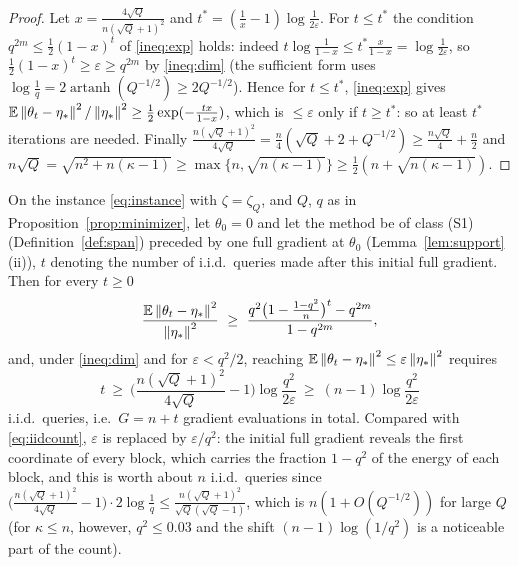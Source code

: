 \begin{proof}
Let $x=\frac{4\sqrt Q}{n(\sqrt Q+1)^2}$ and $t^\ast=(\frac1x-1)\log\frac1{2\varepsilon}$. For $t\le t^\ast$ the condition $q^{2m}\le\frac12(1-x)^t$ of \eqref{ineq:exp} holds: indeed $t\log\frac1{1-x}\le t^\ast\frac{x}{1-x}=\log\frac1{2\varepsilon}$, so $\frac12(1-x)^t\ge\varepsilon\ge q^{2m}$ by \eqref{ineq:dim} (the sufficient form uses $\log\frac1q=2\operatorname{artanh}(Q^{-1/2})\ge2Q^{-1/2}$). Hence for $t\le t^\ast$, \eqref{ineq:exp} gives $\mathbb{E}\left\|\theta_t-\eta_\ast\right\|^2/\left\|\eta_\ast\right\|^2\ge\frac12\exp(-\frac{tx}{1-x})$, which is $\le\varepsilon$ only if $t\ge t^\ast$: so at least $t^\ast$ iterations are needed. Finally $\frac{n(\sqrt Q+1)^2}{4\sqrt Q}=\frac n4(\sqrt Q+2+Q^{-1/2})\ge\frac{n\sqrt Q}4+\frac n2$ and $n\sqrt Q=\sqrt{n^2+n(\kappa-1)}\ge\max\{n,\sqrt{n(\kappa-1)}\}\ge\frac12(n+\sqrt{n(\kappa-1)})$.
\end{proof}

\begin{corollary}
\label{cor:sweep}
On the instance \eqref{eq:instance} with $\zeta=\zeta_Q$, and $Q$, $q$ as in Proposition~\ref{prop:minimizer}, let $\theta_0=0$ and let the method be of class (S1) (Definition~\ref{def:span}) preceded by one full gradient at $\theta_0$ (Lemma~\ref{lem:support}(ii)), $t$ denoting the number of i.i.d.\ queries made after this initial full gradient. Then for every $t\ge0$
\begin{equation}
\label{ineq:expected-sweep}
\frac{\E\norm{\theta_t-\etastar}^2}{\norm{\etastar}^2}\ \ge\ \frac{q^2\big(1-\frac{1-q^2}n\big)^t-q^{2m}}{1-q^{2m}},
\end{equation}
and, under \eqref{ineq:dim} and for $\varepsilon<q^2/2$, reaching $\mathbb{E}\left\|\theta_t-\eta_\ast\right\|^2\le\varepsilon\left\|\eta_\ast\right\|^2$ requires
\[
t\ \ge\ \Big(\frac{n(\sqrt Q+1)^2}{4\sqrt Q}-1\Big)\log\frac{q^2}{2\varepsilon}\ \ge\ (n-1)\log\frac{q^2}{2\varepsilon}
\]
i.i.d.\ queries, i.e.\ $G=n+t$ gradient evaluations in total. Compared with \eqref{eq:iidcount}, $\varepsilon$ is replaced by $\varepsilon/q^2$: the initial full gradient reveals the first coordinate of every block, which carries the fraction $1-q^2$ of the energy of each block, and this is worth about $n$ i.i.d.\ queries since $\big(\frac{n(\sqrt Q+1)^2}{4\sqrt Q}-1\big)\cdot2\log\frac1q\le\frac{n(\sqrt Q+1)^2}{\sqrt Q(\sqrt Q-1)}$, which is $n(1+O(Q^{-1/2}))$ for large $Q$ (for $\kappa\le n$, however, $q^2\le0.03$ and the shift $(n-1)\log(1/q^2)$ is a noticeable part of the count).
\end{corollary}

